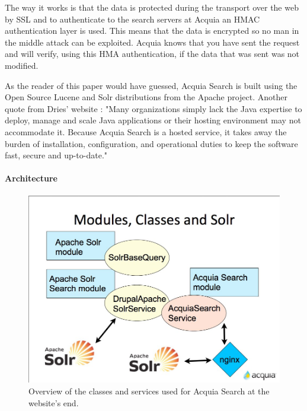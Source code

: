 The way it works is that the data is protected during the transport over the web by SSL and to authenticate to the search servers at Acquia an HMAC authentication layer is used. This means that the data is encrypted so no man in the middle attack can be exploited. Acquia knows that you have sent the request and will verify, using this HMA authentication, if the data that was sent was not modified. 

As the reader of this paper would have guessed, Acquia Search is built using the Open Source Lucene and Solr distributions from the Apache project. Another quote from Dries' website : "Many organizations simply lack the Java expertise to deploy, manage and scale Java applications or their hosting environment may not accommodate it. Because Acquia Search is a hosted service, it takes away the burden of installation, configuration, and operational duties to keep the software fast, secure and up-to-date."

\paragraph{Architecture}
\begin{figure}[H]
     \includegraphics[width=\textwidth]{images/acquia_solr_classes.jpg}
     \caption{Overview of the classes and services used for Acquia Search at the website's end.}
\end{figure}

